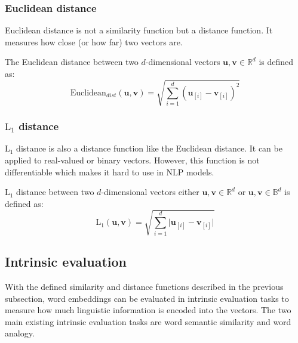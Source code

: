     \subsubsection{Euclidean distance}
      Euclidean distance is not a similarity function but a distance function.
      It measures how close (or how far) two vectors are.

      \theoremstyle{definition}
      \begin{definition}
        \label{ch01:def:def-euclidean}
        The Euclidean distance between two $d$-dimensional vectors
        $\mathbf{u}, \mathbf{v} \in \mathbb{R}^d$ is defined as:
        \begin{equation}
          \text{Euclidean}_{dist} (\mathbf{u}, \mathbf{v}) =
          \sqrt{\sum\limits_{i = 1}^d (\mathbf{u}_{[i]} - \mathbf{v}_{[i]})^2}
        \end{equation}
      \end{definition}

    \subsubsection{$\text{L}_1$ distance}
      $\text{L}_1$ distance is also a distance function like the Euclidean
      distance. It can be applied to real-valued or binary vectors. However,
      this function is not differentiable which makes it hard to use in NLP
      models.

      \theoremstyle{definition}
      \begin{definition}
        \label{ch01:def:def-L1-distance}
        $\text{L}_1$ distance between two $d$-dimensional vectors either
        $\mathbf{u}, \mathbf{v} \in \mathbb{R}^d$ or $\mathbf{u}, \mathbf{v} \in
        \mathbb{B}^d$ is defined as:
        \begin{equation}
          \text{L}_{1} (\mathbf{u}, \mathbf{v}) = \sqrt{\sum\limits_{i = 1}^d
          \lvert \mathbf{u}_{[i]} - \mathbf{v}_{[i]} \rvert}
        \end{equation}
      \end{definition}

  \subsection{Intrinsic evaluation}
    \label{ch01:subsec:intrinsic-evaluation}
    With the defined similarity and distance functions described in the previous
    subsection, word embeddings can be evaluated in intrinsic evaluation tasks
    to measure how much linguistic information is encoded into the vectors. The
    two main existing intrinsic evaluation tasks are word semantic similarity
    and word analogy.

